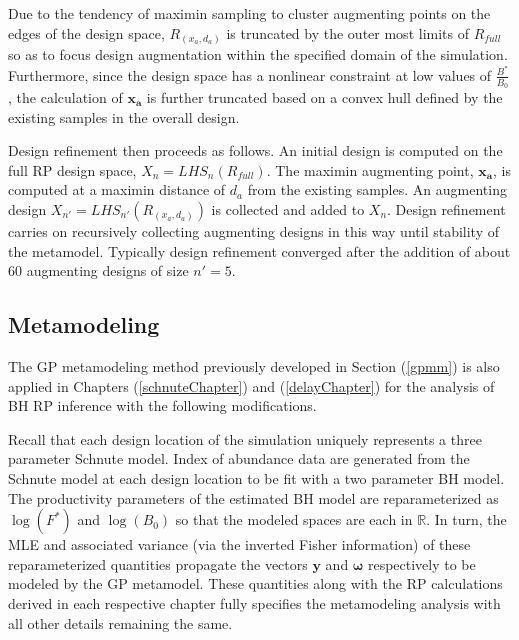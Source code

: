%
Due to the tendency of maximin sampling to cluster augmenting points on the edges
of the design space, $R_{(x_a, d_a)}$ is truncated by the outer most limits of
$R_{full}$ so as to focus design augmentation within the specified domain of the
simulation. Furthermore, since the design space has a nonlinear constraint at low
values of $\frac{B^*}{B_0}$, the calculation of $\bm{x_a}$ is further truncated
based on a convex hull defined by the existing samples in the overall design.

%
Design refinement then proceeds as follows. An initial design is computed on the 
full RP design space, $X_{n} = LHS_{n}(R_{full})$. %
The maximin augmenting point, $\bm{x_a}$, is computed at a maximin distance of $d_a$ 
from the existing samples. An augmenting design $X_{n'} = LHS_{n'}(R_{(x_a, d_a)})$ 
is collected and added to $X_n$. Design refinement carries on recursively 
collecting augmenting designs in this way until %
stability of the metamodel. Typically design refinement converged after the 
addition of about 60 augmenting designs of size $n'=5$.

%
\clearpage
\subsection{Metamodeling}

%
The GP metamodeling method previously developed in Section (\ref{gpmm}) is 
also applied in Chapters (\ref{schnuteChapter}) and (\ref{delayChapter}) for the 
analysis of BH RP inference with the following modifications.

%
Recall that each design location of the simulation uniquely represents a three parameter 
Schnute model. Index of abundance data are generated from the Schnute model 
at each design location to be fit with a two parameter BH model.
The productivity parameters of the estimated BH model are reparameterized as 
$\log(F^*)$ and $\log(B_0)$ so that the modeled spaces are each in $\mathbb{R}$.
In turn, the MLE and associated variance (via the inverted Fisher information) 
of these reparameterized quantities propagate the vectors 
$\textbf{y}$ and $\bm{\omega}$ respectively to be modeled by the GP metamodel. 
These quantities along with the RP calculations derived in each respective chapter 
fully specifies the metamodeling analysis with all other details remaining the same. 

